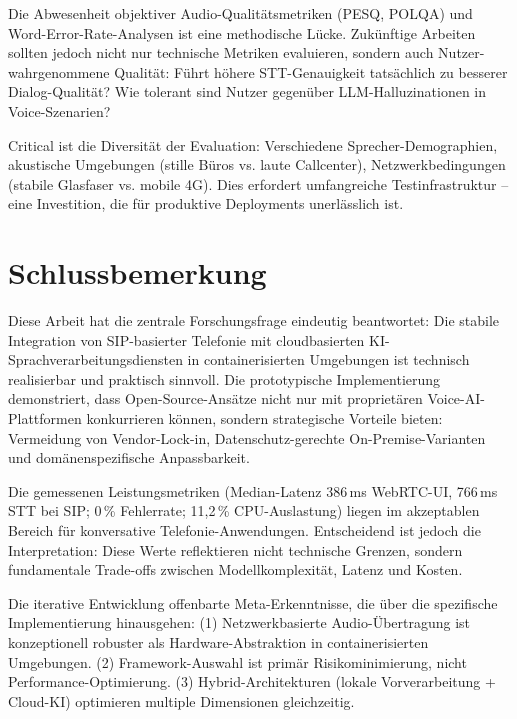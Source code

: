 Die Abwesenheit objektiver Audio-Qualitätsmetriken (\acrshort{PESQ}, \acrshort{POLQA}) und Word-Error-Rate-Analysen ist eine methodische Lücke. Zukünftige Arbeiten sollten jedoch nicht nur technische Metriken evaluieren, sondern auch Nutzer-wahrgenommene Qualität: Führt höhere \acrshort{STT}-Genauigkeit tatsächlich zu besserer Dialog-Qualität? Wie tolerant sind Nutzer gegenüber \acrshort{LLM}-Halluzinationen in Voice-Szenarien?

Critical ist die Diversität der Evaluation: Verschiedene Sprecher-Demographien, akustische Umgebungen (stille Büros vs. laute Callcenter), Netzwerkbedingungen (stabile Glasfaser vs. mobile 4G). Dies erfordert umfangreiche Testinfrastruktur -- eine Investition, die für produktive Deployments unerlässlich ist.

\section{Schlussbemerkung}

Diese Arbeit hat die zentrale Forschungsfrage eindeutig beantwortet: Die stabile Integration von \acrshort{SIP}-basierter Telefonie mit cloudbasierten \acrshort{KI}-Sprachverarbeitungsdiensten in containerisierten Umgebungen ist technisch realisierbar und praktisch sinnvoll. Die prototypische Implementierung demonstriert, dass Open-Source-Ansätze nicht nur mit proprietären Voice-\acrshort{AI}-Plattformen konkurrieren können, sondern strategische Vorteile bieten: Vermeidung von Vendor-Lock-in, Datenschutz-gerechte On-Premise-Varianten und domänenspezifische Anpassbarkeit.

Die gemessenen Leistungsmetriken (Median-Latenz 386\,ms \acrshort{WebRTC}-\acrshort{UI}, 766\,ms \acrshort{STT} bei \acrshort{SIP}; 0\,\% Fehlerrate; 11{,}2\,\% \acrshort{CPU}-Auslastung) liegen im akzeptablen Bereich für konversative Telefonie-Anwendungen. Entscheidend ist jedoch die Interpretation: Diese Werte reflektieren nicht technische Grenzen, sondern fundamentale Trade-offs zwischen Modellkomplexität, Latenz und Kosten.

Die iterative Entwicklung offenbarte Meta-Erkenntnisse, die über die spezifische Implementierung hinausgehen: (1) Netzwerkbasierte Audio-Übertragung ist konzeptionell robuster als Hardware-Abstraktion in containerisierten Umgebungen. (2) Framework-Auswahl ist primär Risikominimierung, nicht Performance-Optimierung. (3) Hybrid-Architekturen (lokale Vorverarbeitung + Cloud-\acrshort{KI}) optimieren multiple Dimensionen gleichzeitig.


